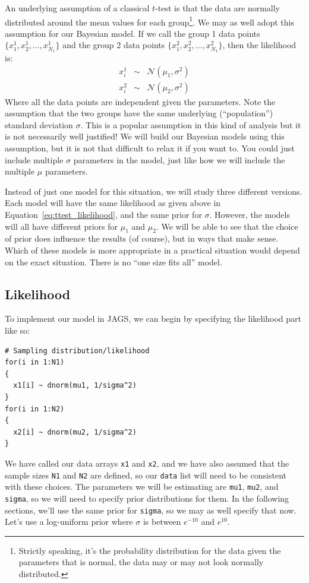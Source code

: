 An underlying assumption of a classical $t$-test is that the data are normally
distributed around the mean values for each group\footnote{Strictly speaking,
it's the probability distribution for the data given the parameters
that is normal, the data may or may not look normally distributed.}.
We may as well adopt this
assumption for our Bayesian model. If we call the group 1
data points $\{x^1_1, x^1_2, ..., x^1_{N_1}\}$ and the group 2 data points
$\{x^2_1, x^2_2, ..., x^2_{N_1}\}$, then the likelihood is:
\begin{eqnarray}
x^1_i &\sim& \mathcal{N}\left(\mu_1, \sigma^2\right)\nonumber\\
x^2_i &\sim& \mathcal{N}\left(\mu_2, \sigma^2\right)\label{eq:ttest_likelihood}
\end{eqnarray}
Where all the data points are independent given the parameters. Note the assumption that
the two groups have the same underlying (``population'') standard deviation $\sigma$. This is a popular
assumption in this kind of analysis but it is not necessarily well justified!
We will build our Bayesian models using this assumption, but it is not that
difficult to relax it if you want to. You could just include multiple
$\sigma$ parameters in the model,
just like how we will include the multiple $\mu$ parameters.

Instead of just one model for this situation, we will study three different
versions. Each model will have the same likelihood
as given above in Equation~\ref{eq:ttest_likelihood}, and the same prior
for $\sigma$. However, the models will all have different priors for $\mu_1$
and $\mu_2$.
We will be able to see that the choice of prior does
influence the results (of course), but in ways that make sense. Which of these
models is more appropriate in a practical situation would depend on the exact
situation. There is no ``one size fits all'' model.

\subsection{Likelihood}
To implement our model in JAGS, we can begin by specifying the likelihood
part like so:

\begin{verbatim}
# Sampling distribution/likelihood
for(i in 1:N1)
{
  x1[i] ~ dnorm(mu1, 1/sigma^2)
}
for(i in 1:N2)
{
  x2[i] ~ dnorm(mu2, 1/sigma^2)
}
\end{verbatim}
We have called our data arrays {\tt x1} and {\tt x2}, and we have also
assumed that the sample sizes {\tt N1} and {\tt N2} are defined, so our
{\tt data} list will need to be consistent with these choices. The parameters
we will be estimating are {\tt mu1}, {\tt mu2}, and {\tt sigma}, so we will
need to specify prior distributions for them. In the following sections, we'll
use the same prior for {\tt sigma}, so we may as well specify that now.
Let's use a log-uniform prior where $\sigma$ is between $e^{-10}$ and
$e^{10}$.

